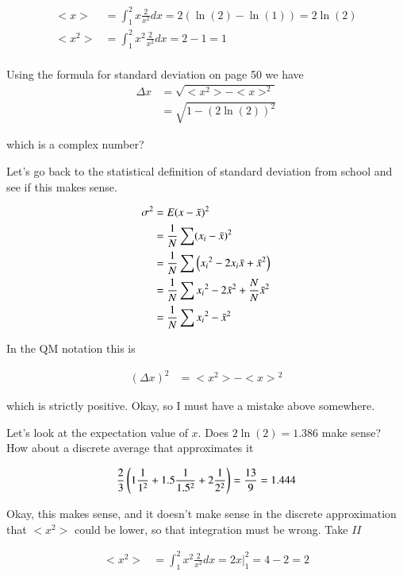 \documentclass{article}
\begin{document}
\begin{align*}
<x> &= \int_1^2 x \frac{2}{x^2} dx = 2 (\ln(2) - \ln(1)) = 2 \ln(2) \\
<x^2> &= \int_1^2 x^2 \frac{2}{x^2} dx = 2 - 1 = 1 \\
\end{align*}

Using the formula for standard deviation on page 50 we have
\begin{align*}
\Delta x &= \sqrt{<x^2> - <x>^2} \\
&= \sqrt{1 - (2 \ln(2))^2}
\end{align*}

which is a complex number?

Let's go back to the statistical definition of standard deviation from school and see if this makes sense.

\begin{align*}
\sigma^2 
&= E( x - \bar{x} )^2 \\
&= \frac{1}{N} \sum (x_i - \bar{x})^2 \\
&= \frac{1}{N} \sum \left({x_i}^2 - 2 x_i \bar{x} + {\bar{x}}^2\right) \\
&= \frac{1}{N} \sum {x_i}^2 - 2 {\bar{x}}^2 + \frac{N}{N} {\bar{x}}^2 \\
&= \frac{1}{N} \sum {x_i}^2 - {\bar{x}}^2 \\
\end{align*}

In the QM notation this is

\begin{align*}
(\Delta x)^2 &= <x^2> - {<x>}^2
\end{align*}

which is strictly positive.  Okay, so I must have a mistake above somewhere.

Let's look at the expectation value of $x$.  Does $2 \ln(2) = 1.386$ make sense?  How about a discrete average that approximates it

\begin{align*}
\frac{2}{3}\left( 1 \frac{1}{1^2} + 1.5 \frac{1}{1.5^2} + 2 \frac{1}{2^2} \right) = \frac{13}{9} = 1.444
\end{align*}

Okay, this makes sense, and it doesn't make sense in the discrete approximation that $<x^2>$ could be lower, so that integration
must be wrong.  Take $II$

\begin{align*}
<x^2> &= \int_1^2 x^2 \frac{2}{x^2} dx = {\left.2x\right\vert}_1^2 = 4 - 2 = 2 \\
\end{align*}
\end{document}
